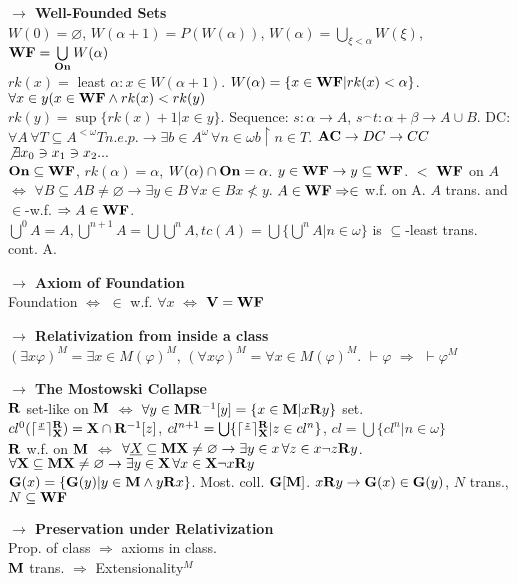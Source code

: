 \documentclass[9pt]{article}
\newcommand{\class}[1]{{\bf #1}}
\newcommand{\mytitle}[1]{ {\bf $\rightarrow$ #1}\\}
\newcommand{\On}{\class{On}}
\newcommand{\V}{\class{V}}
\newcommand{\M}{\class{M}}
\newcommand{\Rr}{\class{R}}
\newcommand{\WF}{\class{WF}}
\newcommand{\X}{\class{X}}
\begin{document}
\begin{multicols*}{2}
\mytitle{Well-Founded Sets}
$W(0)=\varnothing$, $W(\alpha+1)=P(W(\alpha))$, $W(\alpha)=\bigcup\limits_{\xi<\alpha}W(\xi)$, $\WF=\bigcup\limits_{\On}W(\alpha)$\\
$rk(x)=$ least $\alpha\colon x\in W(\alpha+1)$. $W(\alpha)=\{x\in \WF|rk(x)<\alpha\}$. $\forall x\in y (x\in \WF\wedge rk(x)<rk(y)$\\
$rk(y)=\sup\{rk(x)+1|x\in y\}$. Sequence: $s\colon\alpha\to A$, $s^\smallfrown t\colon \alpha+\beta\to A\cup B$.
DC: $\forall A\,\forall T\subseteq A^{<\omega} T n.e.p. \to \exists b\in A^\omega \,\forall n\in\omega b\upharpoonright n\in T$. $\class{AC}\to DC\to CC$\\
$\not\exists x_0\ni x_1\ni x_2...$\\ $\On\subseteq \WF$, $rk(\alpha)=\alpha$, $W(\alpha)\cap \On=\alpha$. $y\in \WF\to y\subseteq \WF$. $<$ $\WF$ on $A$ $\Leftrightarrow$ $\forall B\subseteq A B\neq \varnothing\to\exists y\in B\,\forall x\in B x\nless y$. $A\in \WF\Rightarrow \in$ w.f. on A. $A$ trans. and $\in$-w.f. $\Rightarrow A\in \WF$.\\
$\bigcup^0A=A,\bigcup^{n+1}A=\bigcup\bigcup^{n}A,tc(A)=\bigcup\{\bigcup^n A|n\in\omega\}$ is $\subseteq$-least trans. cont. A.

\mytitle{Axiom of Foundation}
Foundation $\Leftrightarrow$ $\in$ w.f. $\forall x$ $\Leftrightarrow$ $\V=\WF$

\mytitle{Relativization from inside a class}
$(\exists x \varphi)^M=\exists x\in M(\varphi)^M$, $(\forall x \varphi)^M=\forall x\in M(\varphi)^M$. $\vdash\varphi$ $\Rightarrow$ $\vdash\varphi^M$

\mytitle{The Mostowski Collapse}
$\class{R}$ set-like on $\class{M}$ $\Leftrightarrow$ $\forall y\in \class{M} \class{R}^{-1}[y]=\{x\in \class{M}|x\class{R}y\}$ set.\\
$cl^0(\lceil\frac{x}{}\rceil^\Rr_\X)=\X\cap \Rr^{-1}[z]$, $cl^{n+1}=\bigcup\{\lceil\frac{z}{}\rceil^\Rr_\X|z\in cl^n\}$, $cl=\bigcup \{cl^n|n\in\omega\}$\\
$\Rr$ w.f. on $\class{M}$ $\Leftrightarrow$ $\forall \underline{X}\subseteq \M \X\neq\varnothing\to\exists y\in x\,\forall z\in x \neg z\Rr y$.
$\forall\class{X}\subseteq\class{M} \class{X}\neq\varnothing\to\exists y\in\class{X}\,\forall x\in\class{X}\neg x\Rr y$\\
$\class{G}(x)=\{\class{G}(y)|y\in\class{M}\wedge y\class{R}x\}$. Most. coll. $\class{G}[\class{M}]$. $x\class{R}y\to \class{G}(x)\in\class{G}(y)$, $N$ trans., $N\subseteq \WF$

\mytitle{Preservation under Relativization}
Prop. of class $\Rightarrow$ axioms in class.\\
$\class{M}$ trans. $\Rightarrow$ Extensionality$^M$


\end{multicols*}
\end{document}
